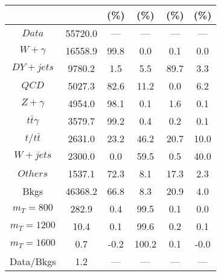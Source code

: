 \begin{figure}
\begin{minipage}[c]{0.32\textwidth}
{\begin{tabular}{cccccc}
 &  & (\%) & (\%) & (\%) & (\%)  \\
\hline
                                                                      $ Data $ &  55720.0 &  --- &  --- &  --- &  ---\\
$ W+\gamma $ &  16558.9 &  99.8 &  0.0 &  0.1 &  0.0\\
$ DY+jets $ &  9780.2 &  1.5 &  5.5 &  89.7 &  3.3\\
$ QCD $ &  5027.3 &  82.6 &  11.2 &  0.0 &  6.2\\
$ Z+\gamma $ &  4954.0 &  98.1 &  0.1 &  1.6 &  0.1\\
$ t\bar{t}\gamma $ &  3579.7 &  99.2 &  0.4 &  0.2 &  0.1\\
$ t/t\bar{t} $ &  2631.0 &  23.2 &  46.2 &  20.7 &  10.0\\
$ W+jets $ &  2300.0 &  0.0 &  59.5 &  0.5 &  40.0\\
$ Others $ &  1537.1 &  72.3 &  8.1 &  17.3 &  2.3\\
Bkgs &  46368.2 &  66.8 &  8.3 &  20.9 &  4.0\\
$ m_{T} = 800 $ &  282.9 &  0.4 &  99.5 &  0.1 &  0.0\\
$ m_{T} = 1200 $ &  10.4 &  0.1 &  99.6 &  0.2 &  0.1\\
$ m_{T} = 1600 $ &  0.7 &  -0.2 &  100.2 &  0.1 &  -0.0\\
Data/Bkgs &  1.2 &  --- &  --- &  --- &  ---\\
\hline
\end{tabular}
}
\end{minipage}
\end{figure}

